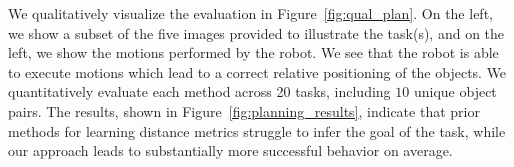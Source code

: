 We qualitatively visualize the evaluation in Figure~\ref{fig:qual_plan}. On the left, we show a subset of the five images provided to illustrate the task(s), and on the left, we show the motions performed by the robot. We see that the robot is able to execute motions which lead to a correct relative positioning of the objects.
We quantitatively evaluate each method across 20 tasks, including $10$ unique object pairs. The results, shown in Figure~\ref{fig:planning_results}, indicate that prior methods for learning distance metrics struggle to infer the goal of the task, while our approach leads to substantially more successful behavior on average. 

